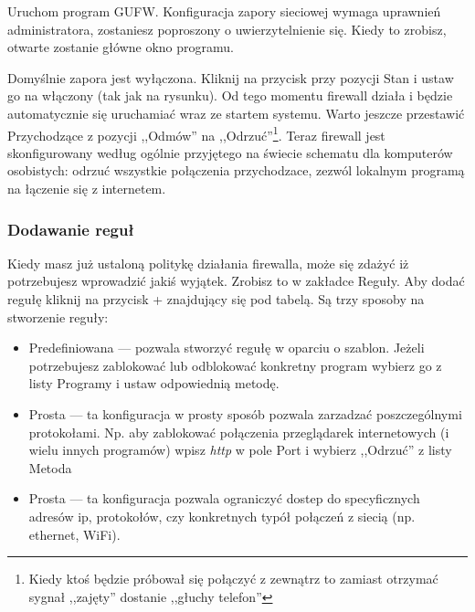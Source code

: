 Uruchom program GUFW. Konfiguracja zapory sieciowej wymaga uprawnień administratora, zostaniesz poproszony o uwierzytelnienie się. Kiedy to zrobisz, otwarte zostanie główne okno programu.

Domyślnie zapora jest wyłączona. Kliknij na przycisk przy pozycji \textcolor{ubuntu_orange}{Stan} i ustaw go na włączony (tak jak na rysunku). Od tego momentu firewall działa i będzie automatycznie się uruchamiać wraz ze startem systemu. Warto jeszcze przestawić \textcolor{ubuntu_orange}{Przychodzące} z pozycji ,,Odmów'' na ,,Odrzuć''\footnote{Kiedy ktoś będzie próbował się połączyć z zewnątrz to zamiast otrzymać sygnał ,,zajęty'' dostanie ,,głuchy telefon''}. Teraz firewall jest skonfigurowany według ogólnie przyjętego na świecie schematu dla komputerów osobistych: odrzuć wszystkie połączenia przychodzace, zezwól lokalnym programą na łączenie się z internetem.

\subsubsection{Dodawanie reguł}
Kiedy masz już ustaloną politykę działania firewalla, może się zdażyć iż potrzebujesz wprowadzić jakiś wyjątek. Zrobisz to w zakładce \textcolor{ubuntu_orange}{Reguły}. Aby dodać regułę kliknij na przycisk + znajdujący się pod tabelą. Są trzy sposoby na stworzenie reguły:
\begin{itemize}
\item \textcolor{ubuntu_orange}{Predefiniowana} --- pozwala stworzyć regułę w oparciu o szablon. Jeżeli potrzebujesz zablokować lub odblokować konkretny program wybierz go z listy \textcolor{ubuntu_orange}{Programy} i ustaw odpowiednią metodę.
\item \textcolor{ubuntu_orange}{Prosta} --- ta konfiguracja w prosty sposób pozwala zarzadzać poszczególnymi protokołami. Np. aby zablokować połączenia przeglądarek internetowych (i wielu innych programów) wpisz \textit{http} w pole \textcolor{ubuntu_orange}{Port} i wybierz ,,Odrzuć'' z listy \textcolor{ubuntu_orange}{Metoda}
\item \textcolor{ubuntu_orange}{Prosta} --- ta konfiguracja pozwala ograniczyć dostep do specyficznych adresów ip, protokołów, czy konkretnych typół połączeń z siecią (np. ethernet, WiFi).
\end{itemize}